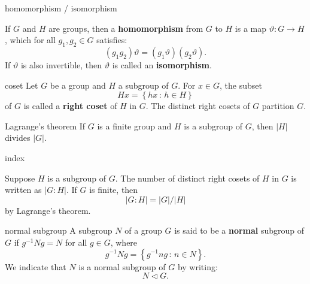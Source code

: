 \documentclass[avery5371,grid]{flashcards}
\newcommand{\abs}[1]{\ensuremath{\left| #1 \right|}}
\newcommand{\set}[2]{\ensuremath{\left\{ #1 \, : \, #2 \right\}}}
\newcommand{\normal}{\ensuremath{\lhd}}
\newcommand{\defn}[1]{\textbf{#1}}
\begin{document}
\begin{flashcard}[Definition]{homomorphism / isomorphism}

  If $G$ and $H$ are groups, then a \defn{homomorphism} from $G$ to
  $H$ is a map $\vartheta : G \to H$, which for all $g_1, g_2 \in G$
  satisfies:
  \[
    (g_1 g_2) \vartheta = (g_1 \vartheta)(g_2 \vartheta).
  \]
  If $\vartheta$ is also invertible, then $\vartheta$ is called an
  \defn{isomorphism}. 
\end{flashcard}

\begin{flashcard}[Definition]{coset}
  Let $G$ be a group and $H$ a subgroup of $G$. For $x \in G$, the subset
  \[
    Hx = \set{hx}{h \in H}
  \]
  of $G$ is called a \defn{right coset} of $H$ in $G$. The distinct
  right cosets of $G$ partition $G$.
\end{flashcard}


\begin{flashcard}[Theorem 1.6]{Lagrange's theorem}
  If $G$ is a finite group and $H$ is a subgroup of $G$, then
  $\abs{H}$ divides $\abs{G}$.
\end{flashcard}

\begin{flashcard}[Definition]{index}

  Suppose $H$ is a subgroup of $G$. The number of distinct right
  cosets of $H$ in $G$ is written as $\abs{G : H}$. If $G$ is finite,
  then
  \[
    \abs{G : H} =\abs{G}/\abs{H}
  \]
  by Lagrange's theorem.

\end{flashcard}

\begin{flashcard}[Definition]{normal subgroup}
  A subgroup $N$ of a group $G$ is said to be a \defn{normal} subgroup
  of $G$ if $g^{-1}Ng = N$ for all $g \in G$, where
  \[
    g^{-1}Ng = \set{g^{-1}ng}{n \in N}.
  \]
  We indicate that $N$ is a normal subgroup of $G$ by writing:
  \[
    N \normal G.
  \]
\end{flashcard}
\end{document}

